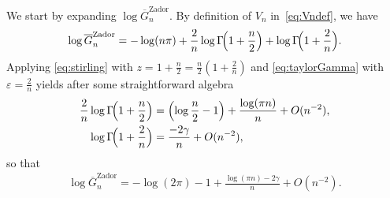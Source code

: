 \documentclass[article,doublecolumn]{IEEEtran}
\begin{document}
\medskip
We start by expanding  $\log \overline{G}_n^{\mathrm{Zador}}$.
By definition of $V_n$ in~\eqref{eq:Vndef}, we have
\begin{align}
\log \overline{G}_n^{\mathrm{Zador}}= -\log(n\pi)+\frac{2}{n}\log\Gamma\!\Bigl(1+\frac n2\Bigr)
+\log\Gamma\!\Bigl(1+\frac{2}{n}\Bigr).
\end{align}
Applying \eqref{eq:stirling} with $z=1+\frac {n}{2}=\frac{n}{2}\left(1+\frac{2}{n} \right)$ and \eqref{eq:taylorGamma} with
$\varepsilon=\frac{2}{n}$ yields after some straightforward algebra
\begin{align}
\frac{2}{n}\log\Gamma\!\Bigl(1+\frac n2\Bigr)&=\left(\log\frac{n}{2}-1 \right)+\frac{\log(\pi n)}{n}+O(n^{-2}),         \\
\log\Gamma\!\Bigl(1+\frac{2}{n}\Bigr)&=\frac{-2\gamma}{n}+O(n^{-2}),
\end{align}
so that
\begin{align}\label{eq:logu}
\log \overline{G}_n^{\mathrm{Zador}}= -\log(2\pi)-1+\frac{\log(\pi n)-2\gamma}{n}
+O(n^{-2}).
\end{align}
\end{document}
